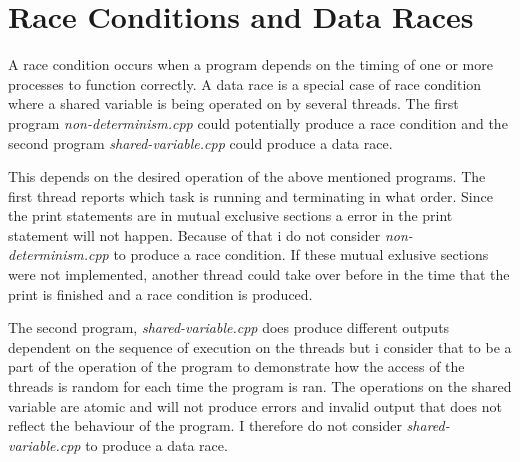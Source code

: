 \section{Race Conditions and Data Races}

A race condition occurs when a program depends on the timing of one or more
processes to function correctly. A data race is a special case of race condition
where a shared variable is being operated on by several threads. The first 
program \textit{non-determinism.cpp} could potentially produce a race condition and
the second program \textit{shared-variable.cpp} could produce a data race.

This depends on the desired operation of the above mentioned programs. The
first thread reports which task is running and terminating in what order. Since 
the print statements are in mutual exclusive sections a error in the print 
statement will not happen. Because of that i do not consider 
\textit{non-determinism.cpp} to produce a race condition. If these mutual exlusive 
sections were not implemented, another thread could take over before in the time 
that the print is finished and a race condition is produced.

The second program, \textit{shared-variable.cpp} does produce different outputs
dependent on the sequence of execution on the threads but i consider that to be 
a part of the operation of the program to demonstrate how the access of the threads
is random for each time the program is ran. The operations on 
the shared variable are atomic and will not produce errors and invalid output
that does not reflect the behaviour of the program. I therefore do not consider
\textit{shared-variable.cpp} to produce a data race.